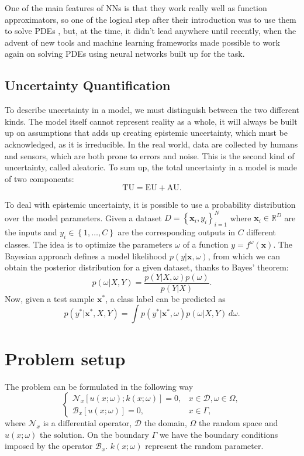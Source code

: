 \documentclass[11pt,a4paper]{article}
\begin{document}
One of the main features of NNs is that they work really well as function approximators, so one of the logical step after their introduction was to use them to solve PDEs \cite{Lagaris_1998}, but, at the time, it didn't lead anywhere until recently, when the advent of new tools and machine learning frameworks made possible to work again on solving PDEs using neural networks built up for the task.
\subsection{Uncertainty Quantification}
To describe uncertainty in a model, we must distinguish between the two different kinds. The model itself cannot represent reality as a whole, it will always be built up on assumptions that adds up creating epistemic uncertainty, which must be acknowledged, as it is irreducible. In the real world, data are collected by humans and sensors, which are both prone to errors and noise. This is the second kind of uncertainty, called aleatoric. To sum up, the total uncertainty in a model is made of two components:
\[
    \text{TU} = \text{EU} + \text{AU}.
\]

To deal with epistemic uncertainty, it is possible to use a probability distribution over the model parameters. Given a dataset \(D = \left\{ \bm{x}_i, y_i \right\}^N_{i=1}\) where \(\bm{x}_i \in \mathbb{R}^D\) are the inputs and \(y_i \in \left\{ 1,\ldots, C \right\}\) are the corresponding outputs in \(C\) different classes. The idea is to optimize the parameters \(\omega\) of a function \(y = f^\omega(\bm{x})\). The Bayesian approach defines a model likelihood \(p(y\vert\bm{x}, \omega)\), from which we can obtain the posterior distribution for a given dataset, thanks to Bayes' theorem:
\[
    p(\omega \vert X, Y) = \frac{p(Y\vert X, \omega)p(\omega)}{p(Y\vert X)}.
\]
Now, given a test sample \(\bm{x}^*\), a class label can be predicted as 
\[
    p(y^*\vert \bm{x}^*, X, Y) = \int p(y^*\vert\bm{x}^*, \omega) p(\omega \vert X, Y) \, d\omega.
\]

\section{Problem setup}
The problem can be formulated in the following way
\begin{equation}
    \begin{cases}
        \mathcal{N}_x\left[ u(x;\omega); k(x;\omega) \right] = 0, & x \in \mathcal{D}, \omega \in \Omega, \\
        \mathcal{B}_x\left[ u(x;\omega) \right] = 0, & x \in \Gamma,
    \end{cases}
    \label{problem_setup}
\end{equation}
where \(\mathcal{N}_x\) is a differential operator, \(\mathcal{D}\) the domain, \(\Omega\) the random space and \(u(x;\omega)\) the solution. On the boundary \(\Gamma\) we have the boundary conditions imposed by the operator \(\mathcal{B}_x\). \(k(x;\omega)\) represent the random parameter.
\end{document}
